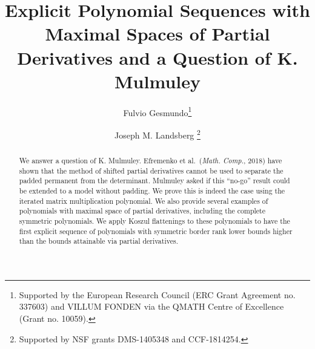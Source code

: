 \documentclass{toc}
\begin{document}
\begin{frontmatter}[classification=text]
%
\title{Explicit Polynomial Sequences with Maximal Spaces of Partial Derivatives and a Question of K. Mulmuley}

%
%
%
%
%
%
%
%
%
%
%
%
%
%
%
%


%
%
%
\author[gesmundo]{Fulvio Gesmundo\thanks{Supported by the European Research Council (ERC Grant Agreement no. 337603) and VILLUM FONDEN via the QMATH Centre of Excellence (Grant no. 10059).}}
\author[landsberg]{Joseph M. Landsberg \thanks{Supported by NSF grants DMS-1405348 and CCF-1814254.}}

%
%
%
%

%
\begin{abstract}
We answer a question of K. Mulmuley.
%
%
Efremenko et al.~(\emph{Math. Comp.}, 2018)  %
%
have shown   %
that the method of shifted partial derivatives cannot be used to separate the padded permanent from the determinant. Mulmuley asked if this ``no-go'' result could be extended to a model without padding. We prove this is indeed the case using the iterated matrix multiplication polynomial. We also provide several examples of polynomials with maximal space of partial derivatives, including the complete symmetric polynomials. We apply Koszul flattenings to these polynomials to have the first explicit sequence of polynomials with symmetric border rank lower bounds higher than the bounds attainable via partial derivatives.
\end{abstract}

%
%
%
%
%
%
%
%
%
%
%
%
%
%
%
%
%
%
%
%
%
%
%
%
%
%
%
%
%


%
%
%
%
%
%
%
%
%
%


%

\end{frontmatter}




%
%
\end{document}
